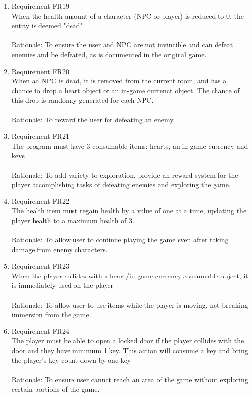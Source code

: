 \documentclass[12pt, titlepage]{article}
\begin{document}
\begin{enumerate}
    \item Requirement FR19\\When the health amount of a character (NPC or player) is reduced to 0, the entity is deemed "dead"\\\\
    {\color{blue}Rationale: To ensure the user and NPC are not invincible and can defeat enemies and be defeated, as is documented in the original game.}
    
    \item Requirement FR20\\When an NPC is dead, it is removed from the current room, and has a chance to drop a heart object or an in-game currenct object. The chance of this drop is randomly generated for each NPC.\\\\
    {\color{blue}Rationale: To reward the user for defeating an enemy.}
    
    \item Requirement FR21\\The program must have 3 consumable items: hearts, an in-game currency and keys\\\\
    {\color{blue}Rationale: To add variety to exploration, provide an reward system for the player accomplishing tasks of defeating enemies and exploring the game.}
    
    \item Requirement FR22\\ The health item must regain health by a value of one at a time, updating the player health to a maximum health of 3.\\\\
    {\color{blue}Rationale: To allow user to continue playing the game even after taking damage from enemy characters.}
    
    \item Requirement FR23\\When the player collides with a  heart/in-game currency consumable object, it is immediately used on the player\\\\
    {\color{blue}Rationale: To allow user to use items while the player is moving, not breaking immersion from the game. }
    
    \item Requirement FR24\\The player must be able to open a locked door if the player collides with the door and they have minimum 1 key. This action will consume a key and bring the player's key count down by one key\\\\
    {\color{blue}Rationale: To ensure user cannot reach an area of the game without exploring certain portions of the game.}
    

\end{enumerate}
\end{document}
